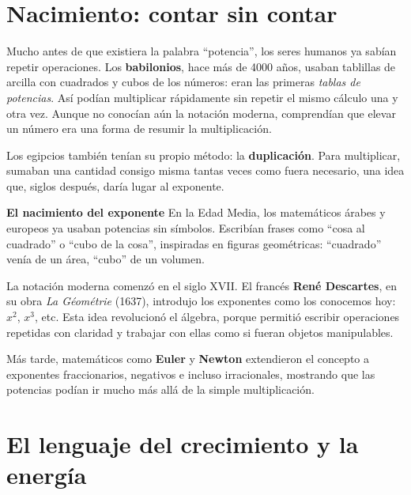 
\vspace{0.5cm}

\vspace{1em} %
\section*{Nacimiento: contar sin contar}

\begin{reseñaplana}
Mucho antes de que existiera la palabra “potencia”, los seres humanos ya sabían repetir operaciones.  
Los \textbf{babilonios}, hace más de 4000 años, usaban tablillas de arcilla con cuadrados y cubos de 
los números: eran las primeras \textit{tablas de potencias}.  
Así podían multiplicar rápidamente sin repetir el mismo cálculo una y otra vez.  
Aunque no conocían aún la notación moderna, comprendían que elevar un número era una forma de resumir la multiplicación.  

Los egipcios también tenían su propio método: la \textbf{duplicación}.  
Para multiplicar, sumaban una cantidad consigo misma tantas veces como fuera necesario, una idea que, 
siglos después, daría lugar al exponente. 

\textbf{El nacimiento del exponente}  
En la Edad Media, los matemáticos árabes y europeos ya usaban potencias sin símbolos.  
Escribían frases como “cosa al cuadrado” o “cubo de la cosa”, inspiradas en figuras geométricas:  
“cuadrado” venía de un área, “cubo” de un volumen.  

La notación moderna comenzó en el siglo XVII.  
El francés \textbf{René Descartes}, en su obra \textit{La Géométrie} (1637), introdujo los exponentes 
como los conocemos hoy: $x^2$, $x^3$, etc.  
Esta idea revolucionó el álgebra, porque permitió escribir operaciones repetidas con claridad y 
trabajar con ellas como si fueran objetos manipulables.  

Más tarde, matemáticos como \textbf{Euler} y \textbf{Newton} extendieron el concepto a exponentes 
fraccionarios, negativos e incluso irracionales, mostrando que las potencias podían ir mucho más 
allá de la simple multiplicación.  
\end{reseñaplana}

\section*{El lenguaje del crecimiento y la energía}

